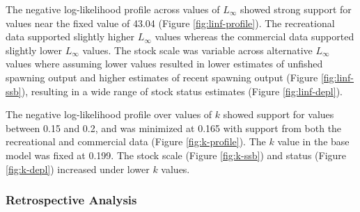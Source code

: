 \documentclass[11pt,
  english,
  a4paper,
]{article}
\begin{document}
\leavevmode\tagmcend\tagstructend\par


The negative log-likelihood profile across values of {\(L_{\infty}\)\leavevmode\tagmcend\tagstructend} showed strong support for values near the fixed value of 43.04 (Figure \ref{fig:linf-profile}). The recreational data supported slightly higher {\(L_{\infty}\)\leavevmode\tagmcend\tagstructend} values whereas the commercial data supported slightly lower {\(L_{\infty}\)\leavevmode\tagmcend\tagstructend} values. The stock scale was variable across alternative {\(L_{\infty}\)\leavevmode\tagmcend\tagstructend} values where assuming lower values resulted in lower estimates of unfished spawning output and higher estimates of recent spawning output (Figure \ref{fig:linf-ssb}), resulting in a wide range of stock status estimates (Figure \ref{fig:linf-depl}).

\leavevmode\tagmcend\tagstructend\par


The negative log-likelihood profile over values of {\(k\)\leavevmode\tagmcend\tagstructend} showed support for values between 0.15 and 0.2, and was minimized at 0.165 with support from both the recreational and commercial data (Figure \ref{fig:k-profile}). The {\(k\)\leavevmode\tagmcend\tagstructend} value in the base model was fixed at 0.199. The stock scale (Figure \ref{fig:k-ssb}) and status (Figure \ref{fig:k-depl}) increased under lower {\(k\)\leavevmode\tagmcend\tagstructend} values.

\leavevmode\tagmcend\tagstructend\par


\hypertarget{retrospective-analysis}{%
\subsubsection{Retrospective Analysis}\label{retrospective-analysis}}
\end{document}
